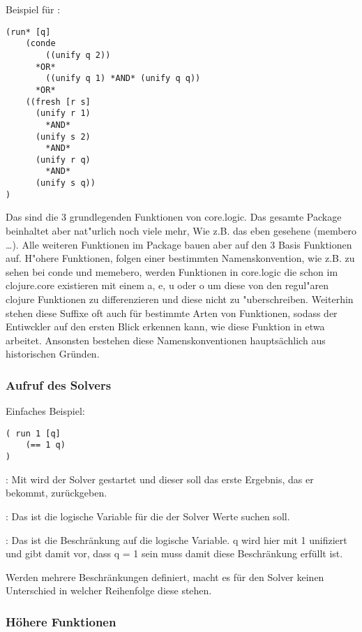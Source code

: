 Beispiel für :
\begin{lstlisting}
(run* [q]
    (conde
        ((unify q 2))
	  *OR*
        ((unify q 1) *AND* (unify q q))
	  *OR*
	((fresh [r s] 
	  (unify r 1)
	    *AND*
	  (unify s 2)
	    *AND*
	  (unify r q)
	    *AND*
	  (unify s q))
)
\end{lstlisting}

Das sind die 3 grundlegenden Funktionen von core.logic. Das gesamte Package beinhaltet aber nat"urlich noch viele mehr, Wie z.B. das eben gesehene (membero \dots{}). Alle weiteren Funktionen im Package bauen aber auf den 3 Basis Funktionen auf. H"ohere Funktionen, folgen einer bestimmten Namenskonvention, wie z.B. zu sehen bei conde und memebero, werden Funktionen in core.logic die schon im clojure.core existieren mit einem a, e, u oder o um diese von den regul"aren clojure Funktionen zu differenzieren und diese nicht zu "uberschreiben. Weiterhin stehen diese Suffixe oft auch für bestimmte Arten von Funktionen, sodass der Entiwckler auf den ersten Blick erkennen kann, wie diese Funktion in etwa arbeitet. Ansonsten bestehen diese Namenskonventionen hauptsächlich aus historischen Gründen.


\subsubsection{Aufruf des Solvers}

Einfaches Beispiel:

\begin{lstlisting}
( run 1 [q] 
	(== 1 q)
)
\end{lstlisting}

\begin{description}
\item{:}
Mit  wird der Solver gestartet und dieser soll das erste Ergebnis, das er bekommt, zurückgeben.
\item{\code{[q]}:}
Das ist die logische Variable für die der Solver Werte suchen soll.
\item{:}
Das ist die Beschränkung auf die logische Variable. q wird hier mit 1 unifiziert und gibt damit vor, dass q = 1 sein muss damit diese Beschränkung erfüllt ist.
\end{description}

Werden mehrere Beschränkungen definiert, macht es für den Solver keinen Unterschied in welcher Reihenfolge diese stehen. 

\subsubsection{Höhere Funktionen}

